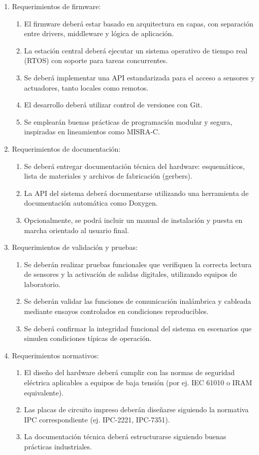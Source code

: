 \documentclass[
11pt, %
]{charter}
\begin{document}
\begin{enumerate}
	\item Requerimientos de firmware:
		\begin{enumerate}
			\item El firmware deberá estar basado en arquitectura en capas, con separación entre drivers, middleware y lógica de aplicación.
			\item La estación central deberá ejecutar un sistema operativo de tiempo real (RTOS) con soporte para tareas concurrentes.
			\item Se deberá implementar una API estandarizada para el acceso a sensores y actuadores, tanto locales como remotos.
			\item El desarrollo deberá utilizar control de versiones con Git.
			\item Se emplearán buenas prácticas de programación modular y segura, inspiradas en lineamientos como MISRA-C.
		\end{enumerate}
		
	\item Requerimientos de documentación:
		\begin{enumerate}
			\item Se deberá entregar documentación técnica del hardware: esquemáticos, lista de materiales y archivos de fabricación (gerbers).
			\item La API del sistema deberá documentarse utilizando una herramienta de documentación automática como Doxygen.
			\item Opcionalmente, se podrá incluir un manual de instalación y puesta en marcha orientado al usuario final.
		\end{enumerate}
		
	\item Requerimientos de validación y pruebas:
		\begin{enumerate}
			\item Se deberán realizar pruebas funcionales que verifiquen la correcta lectura de sensores y la activación de salidas digitales, utilizando equipos de laboratorio.
			\item Se deberán validar las funciones de comunicación inalámbrica y cableada mediante ensayos controlados en condiciones reproducibles.
			\item Se deberá confirmar la integridad funcional del sistema en escenarios que simulen condiciones típicas de operación.
		\end{enumerate}
		
	\item Requerimientos normativos:
		\begin{enumerate}
			\item El diseño del hardware deberá cumplir con las normas de seguridad eléctrica aplicables a equipos de baja tensión (por ej. IEC 61010 o IRAM equivalente).
			\item Las placas de circuito impreso deberán diseñarse siguiendo la normativa IPC correspondiente (ej. IPC-2221, IPC-7351).
			\item La documentación técnica deberá estructurarse siguiendo buenas prácticas industriales.
		\end{enumerate}
		

\end{enumerate}
\end{document}
